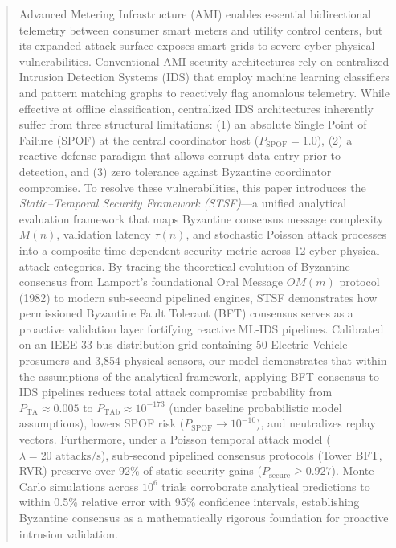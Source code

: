 \documentclass[10pt,twocolumn,journal]{IEEEtran}
\begin{document}
\begin{abstract}
Advanced Metering Infrastructure (AMI) enables essential bidirectional telemetry between consumer smart meters and utility control centers, but its expanded attack surface exposes smart grids to severe cyber-physical vulnerabilities. Conventional AMI security architectures rely on centralized Intrusion Detection Systems (IDS) that employ machine learning classifiers and pattern matching graphs to reactively flag anomalous telemetry. While effective at offline classification, centralized IDS architectures inherently suffer from three structural limitations: (1) an absolute Single Point of Failure (SPOF) at the central coordinator host ($P_{\text{SPOF}} = 1.0$), (2) a reactive defense paradigm that allows corrupt data entry prior to detection, and (3) zero tolerance against Byzantine coordinator compromise. To resolve these vulnerabilities, this paper introduces the \emph{Static–Temporal Security Framework (STSF)}---a unified analytical evaluation framework that maps Byzantine consensus message complexity $M(n)$, validation latency $\tau(n)$, and stochastic Poisson attack processes into a composite time-dependent security metric across 12 cyber-physical attack categories. By tracing the theoretical evolution of Byzantine consensus from Lamport's foundational Oral Message $OM(m)$ protocol (1982) to modern sub-second pipelined engines, STSF demonstrates how permissioned Byzantine Fault Tolerant (BFT) consensus serves as a proactive validation layer fortifying reactive ML-IDS pipelines. Calibrated on an IEEE 33-bus distribution grid containing 50 Electric Vehicle prosumers and 3,854 physical sensors, our model demonstrates that within the assumptions of the analytical framework, applying BFT consensus to IDS pipelines reduces total attack compromise probability from $P_{\text{TA}} \approx 0.005$ to $P_{\text{TAb}} \approx 10^{-173}$ (under baseline probabilistic model assumptions), lowers SPOF risk ($P_{\text{SPOF}} \to 10^{-10}$), and neutralizes replay vectors. Furthermore, under a Poisson temporal attack model ($\lambda = 20\text{ attacks/s}$), sub-second pipelined consensus protocols (Tower BFT, RVR) preserve over 92\% of static security gains ($P_{\text{secure}} \ge 0.927$). Monte Carlo simulations across $10^6$ trials corroborate analytical predictions to within 0.5\% relative error with 95\% confidence intervals, establishing Byzantine consensus as a mathematically rigorous foundation for proactive intrusion validation.
\end{abstract}
\end{document}
